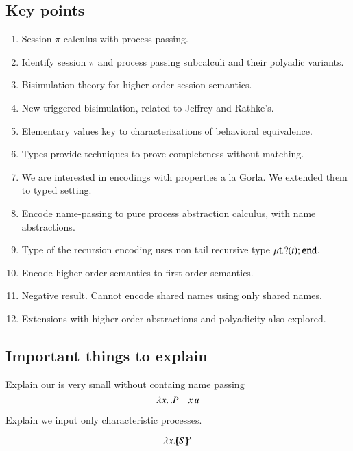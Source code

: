 \subsection{Key points}
\begin{enumerate}[1.]
	\item	Session $\pi$ calculus with process passing.
	\item	Identify session $\pi$ and process passing subcalculi and their polyadic variants.
	\item	Bisimulation theory for higher-order session semantics.
	\item	New triggered bisimulation, related to Jeffrey and Rathke's.
	\item   Elementary values key to characterizations of behavioral equivalence.
	\item	Types provide techniques to prove completeness without matching.
	\item	We are interested in encodings with properties a la Gorla. 
                We extended them to typed setting. 
	\item	Encode name-passing to pure process abstraction calculus, with name abstractions.
	\item	Type of the recursion encoding uses non tail recursive type $\mu\mathsf{t}.? (t) ; \mathtt{end}$.
	\item	Encode higher-order semantics to first order semantics.
	\item	Negative result. Cannot encode shared names using only shared names.
	\item   Extensions with higher-order abstractions and polyadicity also explored.
\end{enumerate}

\smallskip 

\subsection{Important things to explain}
Explain our \HO is very small without containg name passing 
\[ 
\lambda x.\,.P \quad x\, {u}
\]

Explain we input only characteristic processes.  

\[
\lambda x.[\!\!(S)\!\!]^{x}
\]

